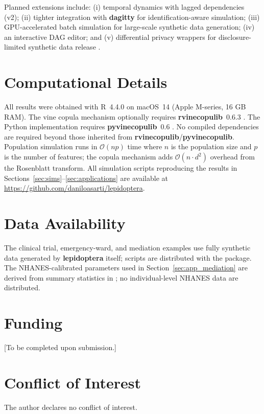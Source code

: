 \documentclass[12pt,a4paper]{article}
\newcommand{\pkg}[1]{\textbf{#1}}
\newcommand{\proglang}[1]{\textsf{#1}}
\begin{document}
Planned extensions include: (i) temporal dynamics with lagged dependencies (v2);
(ii) tighter integration with \pkg{dagitty} for identification-aware simulation;
(iii) GPU-accelerated batch simulation for large-scale synthetic data generation;
(iv) an interactive DAG editor; and (v) differential privacy wrappers for
disclosure-limited synthetic data release \citep{nowok2016synthpop,
reiter2002satisfying}.

\section{Computational Details}
\label{sec:computational}

All results were obtained with \proglang{R}~4.4.0 \citep{rcore2024} on macOS~14
(Apple M-series, 16 GB RAM). The vine copula mechanism optionally requires
\pkg{rvinecopulib}~0.6.3 \citep{nagler2022rvinecopulib}. The \proglang{Python}
implementation requires \pkg{pyvinecopulib}~0.6 \citep{pyvinecopulib2024}. No
compiled dependencies are required beyond those inherited from
\pkg{rvinecopulib}/\pkg{pyvinecopulib}. Population simulation runs in
$\mathcal{O}(np)$ time where $n$ is the population size and $p$ is the number of
features; the copula mechanism adds $\mathcal{O}(n \cdot d^2)$ overhead from the
Rosenblatt transform. All simulation scripts reproducing the results in
Sections~\ref{sec:sims}--\ref{sec:applications} are available at
\url{https://github.com/daniloasarti/lepidoptera}.

\section*{Data Availability}
The clinical trial, emergency-ward, and mediation examples use fully synthetic data
generated by \pkg{lepidoptera} itself; scripts are distributed with the package.
The NHANES-calibrated parameters used in Section~\ref{sec:app_mediation} are
derived from summary statistics in \citet{vanderweele2015explanation}; no
individual-level NHANES data are distributed.

\section*{Funding}
[To be completed upon submission.]

\section*{Conflict of Interest}
The author declares no conflict of interest.
\end{document}

